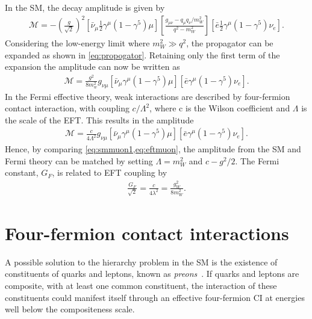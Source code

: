 In the SM, the decay amplitude is given by
\begin{equation}
    \label{eq:smmuon}
    \begin{aligned}
        \mathcal{M} =  - \left( \frac{g}{\sqrt{2}} \right)^2
        [\bar{\nu}_\mu\frac{1}{2}\gamma^\mu(1-\gamma^5)\mu]
        \left[ \frac{g_{\mu\nu} - q_\mu q_\nu/ m_W^2}{q^2 - m_W^2}  \right]
        [\bar{e}\frac{1}{2}\gamma^\mu(1-\gamma^5)\nu_e].
     \end{aligned}
\end{equation}
Considering the low-energy limit where $m_W^2 \gg q^2$, the propagator can be expanded as shown in \cref{eq:propogator}. Retaining only the first term of the expansion the amplitude can now be written as
\begin{equation}
    \label{eq:smmuon1}
    \begin{aligned}
        \mathcal{M} =  \frac{g^2}{8 m_w^2}g_{\nu\mu}
        [\bar{\nu}_\mu\gamma^\mu(1-\gamma^5)\mu]
        [\bar{e}\gamma^\mu(1-\gamma^5)\nu_e].
     \end{aligned}
\end{equation}
In the Fermi effective theory, weak interactions are described by four-fermion contact interaction, with coupling $c/\Lambda^2$, where c is the Wilson coefficient and $\Lambda$ is the scale of the EFT. This results in the amplitude
\begin{equation}
    \label{eq:eftmuon}
    \begin{aligned}
        \mathcal{M} =  \frac{c}{4\Lambda^2}g_{\nu\mu}
        [\bar{\nu}_\mu\gamma^\mu(1-\gamma^5)\mu]
        [\bar{e}\gamma^\mu(1-\gamma^5)\nu_e].
     \end{aligned}
\end{equation}
Hence, by comparing \cref{eq:smmuon1,eq:eftmuon}, the amplitude from the SM and Fermi theory can be matched by setting $\Lambda = m_W^2$ and $ c - g^2/2$. The Fermi constant, $G_F$, is related to EFT coupling by 
\begin{equation}
    \label{eq:fermiconstant}
    \begin{aligned}
        \frac{G_F}{\sqrt{2}} = \frac{c}{4\lambda^2} = \frac{g_W^2}{8m_W^2}. 
     \end{aligned}
\end{equation}

\section{Four-fermion contact interactions}
A possible solution to the hierarchy problem in the SM is the existence of constituents of quarks and leptons, known as \emph{preons}~\cite{Eichten:1984eu,Eichten:1983hw}. If quarks and leptons are composite, with at least one common constituent, the interaction of these constituents could manifest itself through an effective four-fermion CI at energies well below the compositeness scale.

